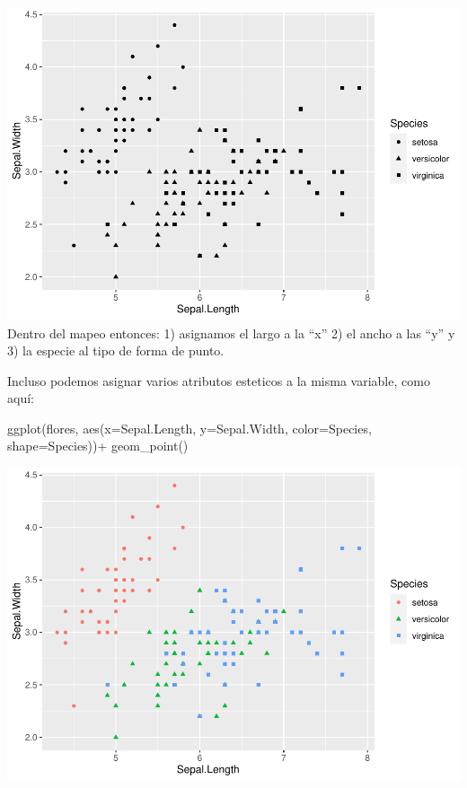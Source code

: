 \documentclass[
]{book}
\newenvironment{Shaded}{\begin{snugshade}}{\end{snugshade}}
\newcommand{\AttributeTok}[1]{\textcolor[rgb]{0.77,0.63,0.00}{#1}}
\newcommand{\FunctionTok}[1]{\textcolor[rgb]{0.00,0.00,0.00}{#1}}
\newcommand{\NormalTok}[1]{#1}
\newcommand{\SpecialCharTok}[1]{\textcolor[rgb]{0.00,0.00,0.00}{#1}}
\begin{document}
\includegraphics{Esatadistica_en_R_files/figure-latex/unnamed-chunk-144-1.pdf}
Dentro del mapeo entonces: 1) asignamos el largo a la ``x'' 2) el ancho a las ``y'' y 3) la especie al tipo de forma de punto.

Incluso podemos asignar varios atributos esteticos a la misma variable, como aquí:

\begin{Shaded}
\begin{Highlighting}[]
\FunctionTok{ggplot}\NormalTok{(flores, }\FunctionTok{aes}\NormalTok{(}\AttributeTok{x=}\NormalTok{Sepal.Length, }\AttributeTok{y=}\NormalTok{Sepal.Width, }\AttributeTok{color=}\NormalTok{Species, }\AttributeTok{shape=}\NormalTok{Species))}\SpecialCharTok{+}
  \FunctionTok{geom\_point}\NormalTok{()}
\end{Highlighting}
\end{Shaded}

\includegraphics{Esatadistica_en_R_files/figure-latex/unnamed-chunk-145-1.pdf}
\end{document}
